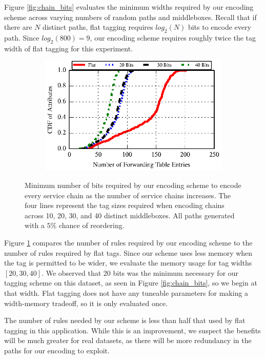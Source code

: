 Figure \ref{fig:chain_bits} evaluates the minimum widths required by our encoding scheme across varying numbers of random paths and middleboxes. Recall that if there are $N$ distinct paths, flat tagging requires $log_2(N)$ bits to encode every path. Since $log_2(800) = 9$, our encoding scheme requires roughly twice the tag width of flat tagging for this experiment. 

\begin{figure}[t!] 
\begin{minipage}{1\linewidth}
\begin{subfigure}[b]{0.96\linewidth}
\includegraphics[width=\linewidth]{figures/attr_cdf}
\end{subfigure} 
\end{minipage} 
\caption{Minimum number of bits required by our encoding scheme to encode every service chain as the number of service chains increases. The four lines represent the tag sizes required when encoding chains across 10, 20, 30, and 40 distinct middleboxes. All paths generated with a $5\%$ chance of reordering.}
\label{fig:chain_rules}
\end{figure}

Figure \ref{fig:chain_rules} compares the number of rules required by our encoding scheme to the number of rules required by flat tags. Since our scheme uses less memory when the tag is permitted to be wider, we evaluate the memory usage for tag widths $[20,30,40]$. We observed that 20 bits was the minimum necessary for our tagging scheme on this dataset, as seen in Figure \ref{fig:chain_bits}, so we begin at that width. Flat tagging does not have any tuneable parameters for making a width-memory tradeoff, so it is only evaluated once.

The number of rules needed by our scheme is less than half that used by flat tagging in this application. While this is an improvement, we suspect the benefits will be much greater for real datasets, as there will be more redundancy in the paths for our encoding to exploit.
